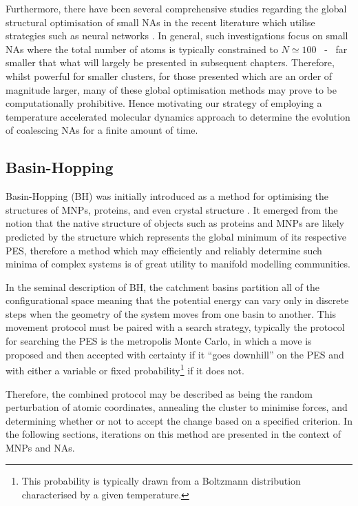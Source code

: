 Furthermore, there have been several comprehensive studies regarding the global structural optimisation of small NAs in the recent literature \cite{Heard2017} which utilise strategies such as neural networks \cite{Han2022-ln,C6CP00342G}. In general, such investigations focus on small NAs where the total number of atoms is typically constrained to $N\simeq100$ ~-~ far smaller that what will largely be presented in subsequent chapters. Therefore, whilst powerful for smaller clusters, for those presented which are an order of magnitude larger, many of these global optimisation methods may prove to be computationally prohibitive. Hence motivating our strategy of employing a temperature accelerated molecular dynamics approach to determine the evolution of coalescing NAs for a finite amount of time.


\subsection{Basin-Hopping}
\label{sec:bh}
Basin-Hopping (BH) was initially introduced as a method for optimising the structures of MNPs, proteins, and even crystal structure \cite{Wales1999-dv}. It emerged from the notion that the native structure of objects such as proteins and MNPs are likely predicted by the structure which represents the global minimum of its respective PES, therefore a method which may efficiently and reliably determine such minima of complex systems is of great utility to manifold modelling communities. 

In the seminal description of BH, the catchment basins partition all of the configurational space meaning that the potential energy can vary only in discrete steps when the geometry of the system moves from one basin to another. This movement protocol must be paired with a search strategy, typically the protocol for searching the PES is the metropolis Monte Carlo,  in which a move is proposed and then accepted with certainty if it ``goes downhill'' on the PES and with either a variable or fixed probability\footnote{This probability is typically drawn from a Boltzmann distribution characterised by a given temperature.} if it does not.

Therefore, the combined protocol may be described as being the random perturbation of atomic coordinates, annealing the cluster to minimise forces, and determining whether or not to accept the change based on a specified criterion. In the following sections, iterations on this method are presented in the context of MNPs and NAs.

